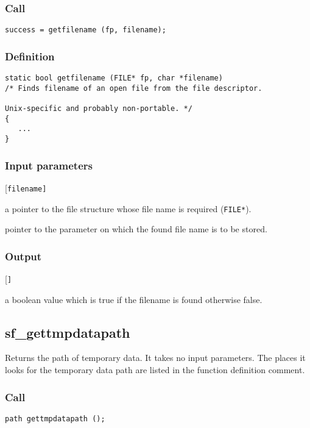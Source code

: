 \subsubsection*{Call}
\begin{verbatim}success = getfilename (fp, filename);\end{verbatim}

\subsubsection*{Definition}
\begin{verbatim}
static bool getfilename (FILE* fp, char *filename)
/* Finds filename of an open file from the file descriptor.

Unix-specific and probably non-portable. */
{
   ...
}
\end{verbatim}

\subsubsection*{Input parameters}
\begin{desclist}{\tt }{\quad}[\tt filename]
   \setlength\itemsep{0pt}
   \item[fp] a pointer to the file structure whose file name is required (\texttt{FILE*}).
   \item[filename] pointer to the parameter on which the found file name is to be stored.    
\end{desclist}

\subsubsection*{Output}
\begin{desclist}{\tt }{\quad}[\tt ]
   \setlength\itemsep{0pt}
   \item[success] a boolean value which is true if the filename is found otherwise false.
\end{desclist}




\subsection{{sf\_gettmpdatapath}}
Returns the path of temporary data. It takes no input parameters. The places it looks for the temporary data path are listed in the function definition comment.

\subsubsection*{Call}
\begin{verbatim}path gettmpdatapath ();\end{verbatim}

